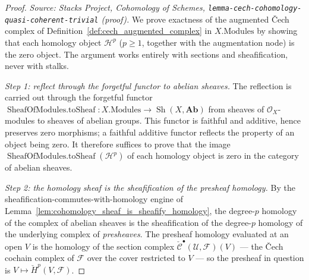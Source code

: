 \begin{proof}
    \leanok
  \textit{Source: Stacks Project, Cohomology of Schemes,
  \texttt{lemma-cech-cohomology-quasi-coherent-trivial} (proof).}
  We prove exactness of the augmented {\v C}ech complex of
  Definition~\ref{def:cech_augmented_complex} in \(X.\mathrm{Modules}\) by showing that each homology
  object \(\mathcal{H}^p\) (\(p \geq 1\), together with the augmentation node) is the zero object. The
  argument works entirely with sections and sheafification, never with stalks.

  \emph{Step 1: reflect through the forgetful functor to abelian sheaves.} The reflection is carried
  out through the forgetful functor \(\operatorname{SheafOfModules.toSheaf} : X.\mathrm{Modules} \to
  \operatorname{Sh}(X, \mathbf{Ab})\) from sheaves of \(\mathcal{O}_X\)-modules to sheaves of abelian
  groups. This functor is faithful and additive, hence preserves zero morphisms; a faithful additive
  functor reflects the property of an object being zero. It therefore suffices to prove that the image
  \(\operatorname{SheafOfModules.toSheaf}(\mathcal{H}^p)\) of each homology object is zero in the
  category of abelian sheaves.

  \emph{Step 2: the homology sheaf is the sheafification of the presheaf homology.} By the
  sheafification-commutes-with-homology engine of
  Lemma~\ref{lem:cohomology_sheaf_is_sheafify_homology}, the degree-\(p\) homology of the complex of
  abelian sheaves is the sheafification of the degree-\(p\) homology of the underlying complex of
  \emph{presheaves}. The presheaf homology evaluated at an open \(V\) is the homology of the section
  complex \(\check{\mathcal{C}}^\bullet(\mathcal{U}, \mathcal{F})(V)\) --- the {\v C}ech cochain complex
  of \(\mathcal{F}\) over the cover restricted to \(V\) --- so the presheaf in question is
  \(V \mapsto \check{H}^p(V, \mathcal{F})\).


\end{proof}
